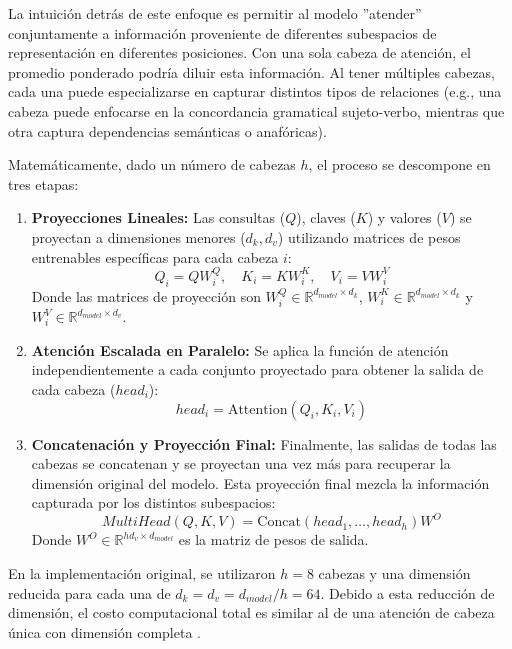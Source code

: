 \documentclass[11pt, a4paper]{article}
\begin{document}
La intuición detrás de este enfoque es permitir al modelo ''atender'' conjuntamente a información proveniente de diferentes subespacios de representación en diferentes posiciones. Con una sola
cabeza de atención, el promedio ponderado podría diluir esta información. Al tener múltiples cabezas, cada una puede especializarse en capturar distintos tipos de relaciones (e.g., una cabeza 
puede enfocarse en la concordancia gramatical sujeto-verbo, mientras que otra captura dependencias semánticas o anafóricas).

Matemáticamente, dado un número de cabezas $h$, el proceso se descompone en tres etapas:

\begin{enumerate}
    \item \textbf{Proyecciones Lineales:} Las consultas ($Q$), claves ($K$) y valores ($V$) se proyectan a dimensiones menores ($d_k, d_v$) utilizando matrices de pesos entrenables específicas
    para cada cabeza $i$:
    \begin{equation}
        Q_i = QW_i^Q, \quad K_i = KW_i^K, \quad V_i = VW_i^V
    \end{equation}
    Donde las matrices de proyección son $W_i^Q \in \mathbb{R}^{d_{model} \times d_k}$, $W_i^K \in \mathbb{R}^{d_{model} \times d_k}$ y $W_i^V \in \mathbb{R}^{d_{model} \times d_v}$.

    \item \textbf{Atención Escalada en Paralelo:} Se aplica la función de atención independientemente a cada conjunto proyectado para obtener la salida de cada cabeza ($head_i$):
    \begin{equation}
        head_i = \text{Attention}(Q_i, K_i, V_i)
    \end{equation}

    \item \textbf{Concatenación y Proyección Final:} Finalmente, las salidas de todas las cabezas se concatenan y se proyectan una vez más para recuperar la dimensión original del modelo. Esta
    proyección final mezcla la información capturada por los distintos subespacios:
    \begin{equation}
        MultiHead(Q, K, V) = \text{Concat}(head_1, \dots, head_h)W^O
    \end{equation}
    Donde $W^O \in \mathbb{R}^{hd_v \times d_{model}}$ es la matriz de pesos de salida.
\end{enumerate}

En la implementación original, se utilizaron $h=8$ cabezas y una dimensión reducida para cada una de $d_k = d_v = d_{model}/h = 64$. Debido a esta reducción de dimensión, el costo computacional
total es similar al de una atención de cabeza única con dimensión completa \cite{vaswani_attention_nodate}.
\end{document}
